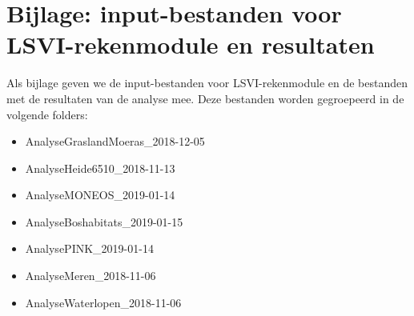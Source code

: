 \documentclass[twoside]{extreport}
\begin{document}
\chapter{Bijlage: input-bestanden voor LSVI-rekenmodule en
resultaten}\label{bijlage-input-bestanden-voor-lsvi-rekenmodule-en-resultaten}

Als bijlage geven we de input-bestanden voor LSVI-rekenmodule en de
bestanden met de resultaten van de analyse mee. Deze bestanden worden
gegroepeerd in de volgende folders:

\begin{itemize}
\tightlist
\item
  AnalyseGraslandMoeras\_2018-12-05
\item
  AnalyseHeide6510\_2018-11-13
\item
  AnalyseMONEOS\_2019-01-14
\item
  AnalyseBoshabitats\_2019-01-15
\item
  AnalysePINK\_2019-01-14
\item
  AnalyseMeren\_2018-11-06
\item
  AnalyseWaterlopen\_2018-11-06
\end{itemize}
\end{document}
